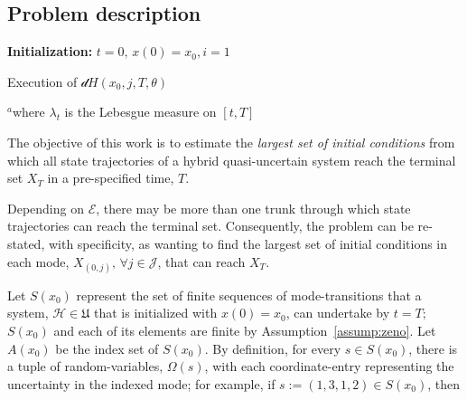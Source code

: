 \subsection{Problem description}
\begin{algorithm}[!t]
\small
{}
 {\bf Initialization:} $t=0,\,x(0)=x_0,i=1$\;
 \While{$i\le|\theta|$}{
 {\em Let} $\gamma\colon [t,T]\rightarrow \mathrm{M}_j$, abs. ct. st.\\\hspace{.2in}
 $\dot \gamma(s)=\tilde f(\gamma(s),\theta_i)$ $\lambda_t^{\text{\tiny a}}$-a.e., $s\in [t,T]$\\\hspace{.2in}
 $\gamma(t)=x(t)$\;
 $\Lambda_{(j,t)}:=\{r\in [t,T]| \exists (j,k)\in \mathcal E \text{ st. } (\gamma(r),\theta_i)\in \mathcal G_{(j,k)}\}$\;
 \eIf {$\Lambda_{(j,t)}\ne \emptyset$}{%
    $t':=\min \Lambda_{(j,t)}$, $k$ st. $\gamma(t')\in \pi_{x}\mathcal G_{(j,k)}$\\\hspace{.2in}
     $x(s)\leftarrow \gamma(s)$, $\forall s\in [t,t')$\\ \hspace{.2in}
    $t\leftarrow t',\,x(t')\leftarrow R_{(j,k)}(\gamma(t')),\,j\leftarrow k,\,i\leftarrow i+1$
 }
 {
 $x(s)=\gamma(s),\,\forall s\in [t,T]$\;
 Stop\;
 }
 }
 \caption{Execution of $\mathcal dH(x_0,j,T,\theta)$}
 \label{alg:execution:simple}
 $^a$where $\lambda_t$ is the Lebesgue measure on $[t,T]$
\end{algorithm}
The objective of this work is to estimate the {\em largest set of initial conditions} from which all state trajectories of a hybrid quasi-uncertain system reach the terminal set $X_T$ in a pre-specified time, $T$.
\par
Depending on $\mathcal E$, there may be more than one trunk through which state trajectories can reach the terminal set. Consequently, the problem can be re-stated, with specificity, as wanting to find the largest set of initial conditions in each mode, $X_{(0,j)},\,\forall j\in \mathcal J$, that can reach $X_T$.
\par
Let $S(x_0)$ represent the set of finite sequences of mode-transitions that a system, $\mathcal H\in \mathfrak U$ that is initialized with $x(0)=x_0$, can undertake by $t=T$; $S(x_0)$ and each of its elements are finite by Assumption~\ref{assump:zeno}. Let $A(x_0)$ be the index set of $S(x_0)$. By definition, for every $s\in S(x_0)$, there is a tuple of random-variables, $\Omega(s)$, with each coordinate-entry representing the uncertainty in the indexed mode; for example, if \mbox{$s:=(1,3,1,2)\in S(x_0)$}, then
